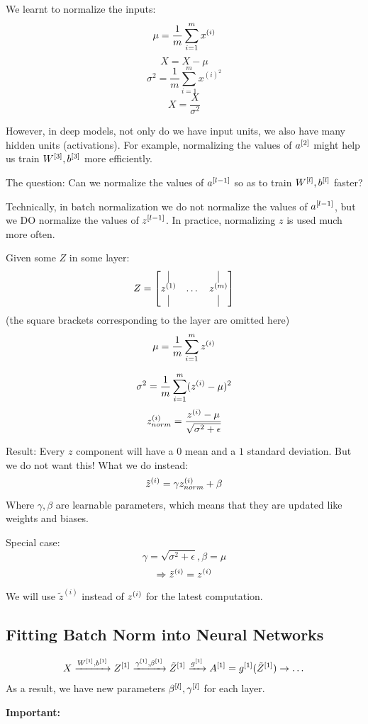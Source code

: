 We learnt to normalize the inputs: 
$$
\mu = \frac{1}{m}\sum_{i=1}^{m} x^{(i)}
$$
$$
X = X-\mu
$$
$$
\sigma^2 = \frac{1}{m}\sum_{i=1}^{m} x^{(i)^2}
$$
$$
X = \frac{X}{\sigma^2}
$$

However, in deep models, not only do we have input units, we also have many hidden units (activations). 
For example, normalizing the values of $a^{[2]}$ might help us train $W^{[3]}, b^{[3]}$ more efficiently.


The question: Can we normalize the values of $a^{[l-1]}$ so as to train $W^{[l]}, b^{[l]}$ faster?

Technically, in batch normalization we do not normalize the values of $a^{[l-1]}$, but we DO normalize the values of $z^{[l-1]}$. 
In practice, normalizing $z$ is used much more often. 

Given some $Z$ in some layer: 
$$
Z = \begin{bmatrix}
    \vline & & \vline\\
    z\idx{1} & \dots & z\idx{m}\\
    \vline & & \vline
\end{bmatrix}
$$
(the square brackets corresponding to the layer are omitted here)
$$
\mu = \frac{1}{m}\sum_{i=1}^{m} z^{(i)}
$$

$$
\sigma^2= \frac{1}{m}\sum_{i=1}^{m} (z^{(i)} - \mu)^2
$$
$$
z^{(i)}_{norm} = \frac{z^{(i)} - \mu}{\sqrt{\sigma^2 + \epsilon}}
$$

Result: Every $z$ component will have a $0$ mean and a $1$ standard deviation. 
But we do not want this! What we do instead: 
$$
\tilde{z}^{(i)} = \gamma z^{(i)}_{norm} + \beta
$$
Where $\gamma, \beta$ are learnable parameters, which means that they are updated like weights and biases.

Special case: 
$$
\gamma = \sqrt{\sigma^2 + \epsilon}, \beta = \mu
$$
$$
\Rightarrow \tilde{z}^{(i)} = z^{(i)}
$$
We will use $\tilde{z}^{(i)}$ instead of $z^{(i)}$ for the latest computation. 


\subsection{Fitting Batch Norm into Neural Networks}
$$
X \xrightarrow{W^{[1]}, b^{[1]}} Z^{[1]} \xrightarrow{\gamma^{[1]}, \beta^{[1]}} \tilde{Z}^{[1]} \xrightarrow{g^{[1]}} A^{[1]} = g^{[1]}(\tilde{Z}^{[1]}) \rightarrow \dots
$$
As a result, we have new parameters $\beta^{[l]}, \gamma^{[l]}$ for each layer. 

\textbf{Important:}

